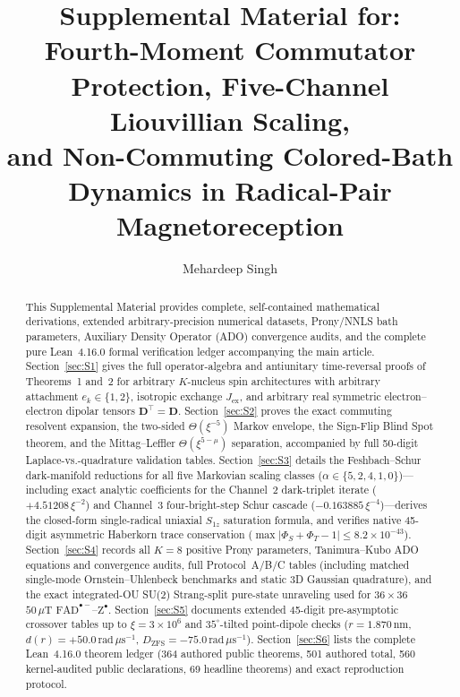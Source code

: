 \documentclass[onecolumn,10pt,notitlepage,amsmath,amssymb,floatfix]{revtex4-2}
\theoremstyle{plain}
\theoremstyle{definition}
\begin{document}
\setlength{\emergencystretch}{1.8em}

\title{Supplemental Material for:\texorpdfstring{\\}{ }%
Fourth-Moment Commutator Protection, Five-Channel Liouvillian Scaling,\texorpdfstring{\\}{ }%
and Non-Commuting Colored-Bath Dynamics in Radical-Pair Magnetoreception}

\author{Mehardeep Singh}

\begin{abstract}
This Supplemental Material provides complete, self-contained mathematical derivations, extended arbitrary-precision numerical datasets, Prony/NNLS bath parameters, Auxiliary Density Operator (ADO) convergence audits, and the complete pure Lean~4.16.0 formal verification ledger accompanying the main article. Section~\ref{sec:S1} gives the full operator-algebra and antiunitary time-reversal proofs of Theorems~1 and~2 for arbitrary $K$-nucleus spin architectures with arbitrary attachment $e_k \in \{1,2\}$, isotropic exchange $J_{\mathrm{ex}}$, and arbitrary real symmetric electron--electron dipolar tensors $\mathbf{D}^\top = \mathbf{D}$. Section~\ref{sec:S2} proves the exact commuting resolvent expansion, the two-sided $\Theta(\xi^{-5})$ Markov envelope, the Sign-Flip Blind Spot theorem, and the Mittag--Leffler $\Theta(\xi^{5-\mu})$ separation, accompanied by full 50-digit Laplace-vs.-quadrature validation tables. Section~\ref{sec:S3} details the Feshbach--Schur dark-manifold reductions for all five Markovian scaling classes ($\alpha \in \{5, 2, 4, 1, 0\}$)---including exact analytic coefficients for the Channel~2 dark-triplet iterate ($+4.51208\,\xi^{-2}$) and Channel~3 four-bright-step Schur cascade ($-0.163885\,\xi^{-4}$)---derives the closed-form single-radical uniaxial $S_{1z}$ saturation formula, and verifies native 45-digit asymmetric Haberkorn trace conservation ($\max|\Phi_S+\Phi_T-1|\le 8.2\times 10^{-43}$). Section~\ref{sec:S4} records all $K=8$ positive Prony parameters, Tanimura--Kubo ADO equations and convergence audits, full Protocol~A/B/C tables (including matched single-mode Ornstein--Uhlenbeck benchmarks and static 3D Gaussian quadrature), and the exact integrated-OU SU(2) Strang-split pure-state unraveling used for $36\times 36$ $50\,\mu\text{T}$ $\mathrm{FAD}^{\bullet-}\text{--}\mathrm{Z}^{\bullet}$. Section~\ref{sec:S5} documents extended 45-digit pre-asymptotic crossover tables up to $\xi = 3\times 10^6$ and $35^\circ$-tilted point-dipole checks ($r = 1.870\,\text{nm}$, $d(r)=+50.0\,\text{rad}\,\mu\text{s}^{-1}$, $D_{\mathrm{ZFS}}=-75.0\,\text{rad}\,\mu\text{s}^{-1}$). Section~\ref{sec:S6} lists the complete Lean~4.16.0 theorem ledger (364 authored public theorems, 501 authored total, 560 kernel-audited public declarations, 69 headline theorems) and exact reproduction protocol.
\end{abstract}
\end{document}

